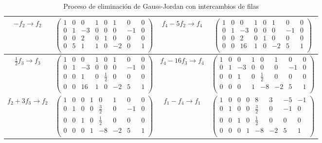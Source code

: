 \begin{prob}
\begin{enumerate}[$a)$]
\begin{myproof}
\begin{table}[H]
{\begin{tabular}{|c|c|c|c|}
\hline
$-f_2 \to f_2$ & $\left( \begin{array}{cccc|cccc}
1&0&0&1&0&1&0&0\\
0&1&-3&0&0&0&-1&0\\
0&0&2&0&1&0&0&0\\
0&5&1&1&0&-2&0&1\\
\end{array} \right)$ & 
$f_4 - 5f_2 \to f_4$ & $\left( \begin{array}{cccc|cccc}
1&0&0&1&0&1&0&0\\
0&1&-3&0&0&0&-1&0\\
0&0&2&0&1&0&0&0\\
0&0&16&1&0&-2&5&1\\
\end{array} \right)$ \\
\hline
$\frac{1}{2}f_3 \to f_3$ & $\left( \begin{array}{cccc|cccc}
1&0&0&1&0&1&0&0\\
0&1&-3&0&0&0&-1&0\\
0&0&1&0&\frac{1}{2}&0&0&0\\
0&0&16&1&0&-2&5&1\\
\end{array} \right)$ & 
$f_4 - 16f_3 \to f_4$ & $\left( \begin{array}{cccc|cccc}
1&0&0&1&0&1&0&0\\
0&1&-3&0&0&0&-1&0\\
0&0&1&0&\frac{1}{2}&0&0&0\\
0&0&0&1&-8&-2&5&1\\
\end{array} \right)$ \\
\hline
$f_2 + 3f_3 \to f_2$ & $\left( \begin{array}{cccc|cccc}
1&0&0&1&0&1&0&0\\
0&1&0&0&\frac{3}{2}&0&-1&0\\
0&0&1&0&\frac{1}{2}&0&0&0\\
0&0&0&1&-8&-2&5&1\\
\end{array} \right)$ & 
$f_1 - f_4 \to f_1$ & $\left( \begin{array}{cccc|cccc}
1&0&0&0&8&3&-5&-1\\
0&1&0&0&\frac{3}{2}&0&-1&0\\
0&0&1&0&\frac{1}{2}&0&0&0\\
0&0&0&1&-8&-2&5&1\\
\end{array} \right)$ \\
\hline
\end{tabular}
}
\caption{Proceso de eliminación de Gauss-Jordan con intercambios de filas}
\label{tab:gauss_jordan_intercambios}
\end{table}


\end{myproof}
\end{enumerate}
\end{prob}

